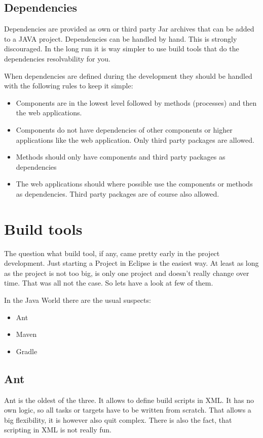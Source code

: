\documentclass[paper=a4,twoside=false,BCOR=0mm,DIV=calc,fontsize=12pt]{scrartcl}
\begin{document}
\subsection{Dependencies}
Dependencies are provided as own or third party Jar archives that can be added to a JAVA project.
Dependencies can be handled by hand. This is strongly discouraged. In the long run it is way simpler to use build tools that do the dependencies resolvability for you.

When dependencies are defined during the development they should be handled with the following rules to keep it simple:
\begin{itemize}
 \item Components are in the lowest level followed by methods (processes) and then the web applications.
 \item Components do not have dependencies of other components or higher applications like the web application. Only third party packages are allowed.
 \item Methods should only have components and third party packages as dependencies
 \item The web applications should where possible use the components or methods as dependencies. Third party packages are of course also allowed.
\end{itemize}


\section{Build tools}
The question what build tool, if any, came pretty early in the project development. Just starting a Project in Eclipse is the easiest way. 
At least as long as the project is not too big, is only one project and doesn't really change over time. That was all not the case. So lets have a look at few of them. 

In the Java World there are the usual suspects:
\begin{itemize}
 \item Ant
 \item Maven
 \item Gradle
\end{itemize}

\subsection{Ant}
Ant is the oldest of the three. It allows to define build scripts in XML. 
It has no own logic, so all tasks or targets have to be written from scratch.
That allows a big flexibility, it is however also quit complex. There is also the fact,
that scripting in XML is not really fun.
\end{document}

